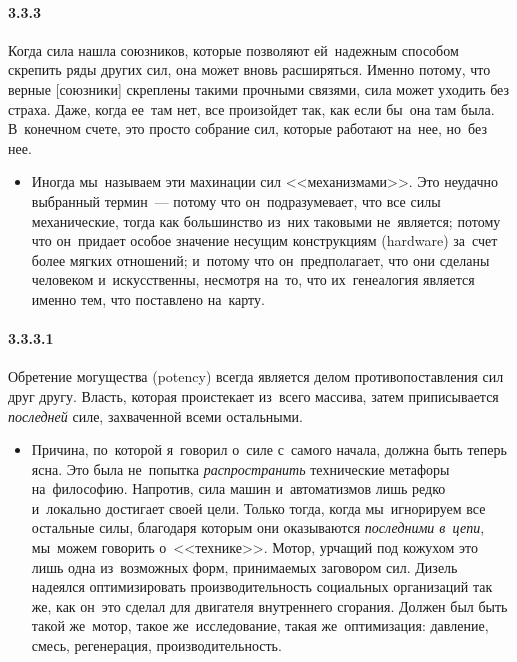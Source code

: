 \paragraph{3.3.3}\hypertarget{par:3.3.3}{} Когда сила нашла союзников, которые позволяют ей~надежным способом скрепить ряды других сил, она может вновь расширяться. Именно потому, что верные [союзники] скреплены такими прочными связями, сила может уходить без страха. Даже, когда ее~там нет, все произойдет так, как если бы~она там была. В~конечном счете, это просто собрание сил, которые работают на~нее, но~без нее.
	\begin{itemize}
	\item 
	Иногда мы~называем эти махинации сил <<механизмами>>. Это неудачно выбранный термин~--- потому что он~подразумевает, что все силы механические, тогда как большинство из~них таковыми не~является; потому что он~придает особое значение несущим конструкциям (hardware) за~счет более мягких отношений; и~потому что он~предполагает, что они сделаны человеком и~искусственны, несмотря на~то, что их~генеалогия является именно тем, что поставлено на~карту.
	\end{itemize}

\paragraph{3.3.3.1}\hypertarget{par:3.3.3.1}{} Обретение могущества (potency) всегда является делом противопоставления сил друг другу. Власть, которая проистекает из~всего массива, затем приписывается {\itshape последней} силе, захваченной всеми остальными. 
	\begin{itemize}
	\item 
	Причина, по~которой я~говорил о~силе с~самого начала, должна быть теперь ясна. Это была не~попытка {\itshape распространить} технические метафоры на~философию. Напротив, сила машин и~автоматизмов лишь редко и~локально достигает своей цели. Только тогда, когда мы~игнорируем все остальные силы, благодаря которым они оказываются {\itshape последними в~цепи}, мы~можем говорить о~<<технике>>. Мотор, урчащий под кожухом это лишь одна из~возможных форм, принимаемых заговором сил. Дизель надеялся оптимизировать производительность социальных организаций так же, как он~это сделал для двигателя внутреннего сгорания. Должен был быть такой же~мотор, такое же~исследование, такая же~оптимизация: давление, смесь, регенерация, производительность.
	\end{itemize}

